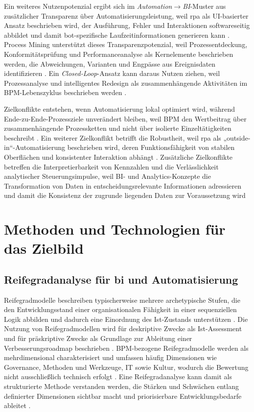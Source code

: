Ein weiteres Nutzenpotenzial ergibt sich im \emph{Automation$\rightarrow$BI}-Muster aus zusätzlicher Transparenz über Automatisierungsleistung, weil \gls{rpa} als UI-basierter Ansatz beschrieben wird, der Ausführung, Fehler und Interaktionen softwareseitig abbildet und damit bot-spezifische Laufzeitinformationen generieren kann \cite{AalstBichlerHeinzl2018RPA}. 
Process Mining unterstützt dieses Transparenzpotenzial, weil Prozessentdeckung, Konformitätsprüfung und Performanceanalyse als Kernelemente beschrieben werden, die Abweichungen, Varianten und Engpässe aus Ereignisdaten identifizieren \cite{Aalst2016ProcessMining}. 
Ein \emph{Closed-Loop}-Ansatz kann daraus Nutzen ziehen, weil Prozessanalyse und intelligentes Redesign als zusammenhängende Aktivitäten im BPM-Lebenszyklus beschrieben werden \cite{Aalst2007FullBPMLifecycle}. 

Zielkonflikte entstehen, wenn Automatisierung lokal optimiert wird, während Ende-zu-Ende-Prozessziele unverändert bleiben, weil BPM den Wertbeitrag über zusammenhängende Prozessketten und nicht über isolierte Einzeltätigkeiten beschreibt \cite{DumasEtAl2013}. 
Ein weiterer Zielkonflikt betrifft die Robustheit, weil \gls{rpa} als „outside-in“-Automatisierung beschrieben wird, deren Funktionsfähigkeit von stabilen Oberflächen und konsistenter Interaktion abhängt \cite{AalstBichlerHeinzl2018RPA}. 
Zusätzliche Zielkonflikte betreffen die Interpretierbarkeit von Kennzahlen und die Verlässlichkeit analytischer Steuerungsimpulse, weil BI- und Analytics-Konzepte die Transformation von Daten in entscheidungsrelevante Informationen adressieren und damit die Konsistenz der zugrunde liegenden Daten zur Voraussetzung wird \cite{BaarsKemper2021,WangStrong1996}



\section{Methoden und Technologien für das Zielbild}\label{sec:methods-tech} 

\subsection{Reifegradanalyse für \gls{bi} und Automatisierung}
Reifegradmodelle beschreiben typischerweise mehrere archetypische Stufen, die den Entwicklungsstand einer organisationalen Fähigkeit in einer sequenziellen Logik abbilden und dadurch eine Einordnung des Ist-Zustands unterstützen \cite{RoeglingerPoeppelbuSS2011}. 
Die Nutzung von Reifegradmodellen wird für deskriptive Zwecke als Ist-Assessment und für präskriptive Zwecke als Grundlage zur Ableitung einer Verbesserungsroadmap beschrieben \cite{RoeglingerPoeppelbuSS2011}. 
BPM-bezogene Reifegradmodelle werden als mehrdimensional charakterisiert und umfassen häufig Dimensionen wie Governance, Methoden und Werkzeuge, IT sowie Kultur, wodurch die Bewertung nicht ausschließlich technisch erfolgt \cite{RoeglingerPoeppelbuSS2011}. 
Eine Reifegradanalyse kann damit als strukturierte Methode verstanden werden, die Stärken und Schwächen entlang definierter Dimensionen sichtbar macht und priorisierbare Entwicklungsbedarfe ableitet \cite{RoeglingerPoeppelbuSS2011}. 

